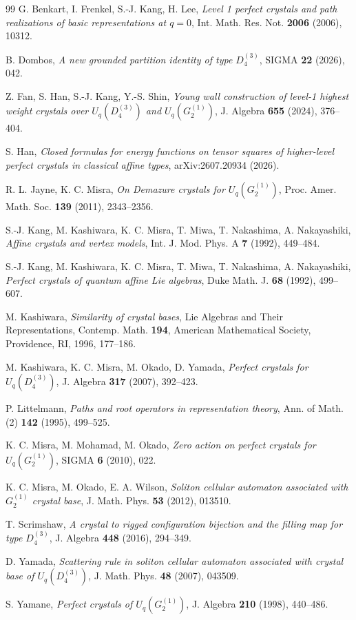 \documentclass[11pt,reqno]{amsart}
\numberwithin{table}{section}
\numberwithin{equation}{section}
\theoremstyle{plain}
\theoremstyle{definition}
\begin{document}
\begin{thebibliography}{99}
	G. Benkart, I. Frenkel, S.-J. Kang, H. Lee,
	\emph{Level 1 perfect crystals and path realizations of basic representations at $q=0$},
	Int. Math. Res. Not. \textbf{2006} (2006), 10312.
	
	B. Dombos,
	\emph{A new grounded partition identity of type $D_4^{(3)}$},
	SIGMA \textbf{22} (2026), 042.
	
	Z. Fan, S. Han, S.-J. Kang, Y.-S. Shin,
	\emph{Young wall construction of level-1 highest weight crystals over
		$U_q(D_4^{(3)})$ and $U_q(G_2^{(1)})$},
	J. Algebra \textbf{655} (2024), 376--404.
	
	S. Han,
	\emph{Closed formulas for energy functions on tensor squares of higher-level perfect crystals in classical affine types},
	arXiv:2607.20934  (2026).
	
	R. L. Jayne, K. C. Misra,
	\emph{On Demazure crystals for $U_q(G_2^{(1)})$},
	Proc. Amer. Math. Soc. \textbf{139} (2011), 2343--2356.
	
	S.-J. Kang, M. Kashiwara, K. C. Misra, T. Miwa, T. Nakashima,
	A. Nakayashiki,
	\emph{Affine crystals and vertex models},
	Int. J. Mod. Phys. A \textbf{7} (1992), 449--484.
	
	S.-J. Kang, M. Kashiwara, K. C. Misra, T. Miwa, T. Nakashima,
	A. Nakayashiki,
	\emph{Perfect crystals of quantum affine Lie algebras},
	Duke Math. J. \textbf{68} (1992), 499--607.
	
	M. Kashiwara,
	\emph{Similarity of crystal bases},
	Lie Algebras and Their Representations, Contemp. Math. \textbf{194},
	American Mathematical Society, Providence, RI, 1996, 177--186.
	
	M. Kashiwara, K. C. Misra, M. Okado, D. Yamada,
	\emph{Perfect crystals for $U_q(D_4^{(3)})$},
	J. Algebra \textbf{317} (2007), 392--423.
	
	P. Littelmann,
	\emph{Paths and root operators in representation theory},
	Ann. of Math. (2) \textbf{142} (1995), 499--525.
	
	K. C. Misra, M. Mohamad, M. Okado,
	\emph{Zero action on perfect crystals for $U_q(G_2^{(1)})$},
	SIGMA \textbf{6} (2010), 022.
	
	K. C. Misra, M. Okado, E. A. Wilson,
	\emph{Soliton cellular automaton associated with $G_2^{(1)}$ crystal base},
	J. Math. Phys. \textbf{53} (2012), 013510.
	
	T. Scrimshaw,
	\emph{A crystal to rigged configuration bijection and the filling map
		for type $D_4^{(3)}$},
	J. Algebra \textbf{448} (2016), 294--349.
	
	D. Yamada,
	\emph{Scattering rule in soliton cellular automaton associated with crystal base of $U_q(D_4^{(3)})$},
	J. Math. Phys. \textbf{48} (2007), 043509.
	
	S. Yamane,
	\emph{Perfect crystals of $U_q(G_2^{(1)})$},
	J. Algebra \textbf{210} (1998), 440--486.
\end{thebibliography}
\end{document}
